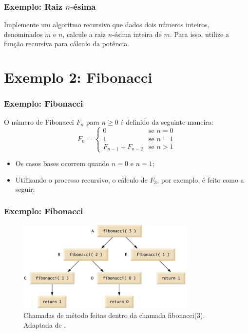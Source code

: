 \documentclass[aspectratio=169]{beamer}
\begin{document}

\begin{frame}
\frametitle{Exemplo: Raiz $n$-ésima}
Implemente um algoritmo recursivo que dados dois números inteiros, denominados $m$ e $n$, calcule a raiz $n$-ésima inteira de $m$. Para isso, utilize a função recursiva para cálculo da potência.
\end{frame}

\section{Exemplo 2: Fibonacci} 

\begin{frame}
\frametitle{Exemplo: Fibonacci}
 O número de Fibonacci $F_{n}$ para $n \geq 0$ é definido da seguinte maneira:
\begin{equation*}
    F_{n} = \begin{cases}
	       0                 & \text{se } n = 0 \\
               1                 & \text{se } n = 1 \\
               F_{n-1} + F_{n-2} & \text{se } n > 1
           \end{cases}
\end{equation*}

\begin{itemize}
\pause
\item Os casos bases ocorrem quando $n = 0$ e $n = 1$;
\item Utilizando o processo recursivo, o cálculo de $F_{3}$, por exemplo, é feito como a seguir:
\end{itemize}
\end{frame}


\begin{frame}[fragile]
\frametitle{Exemplo: Fibonacci}

\begin{figure}[!h]
  \centering
  \includegraphics[width=250pt]{imgs/exemplo2_fibonacci.png}
  \caption{\footnotesize{Chamadas de método feitas dentro da chamada fibonacci(3). Adaptada de .}}
  \label{fig_exemplo_fibonacci1}
\end{figure}
\end{frame}
\end{document}
